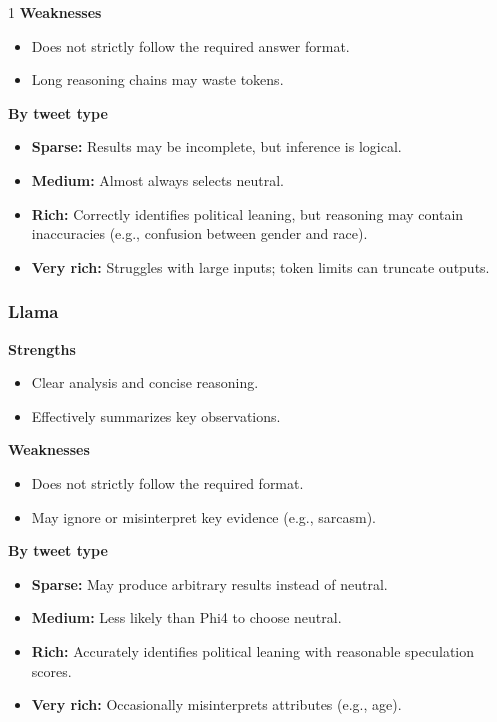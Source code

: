 \begin{spacing}{1}
\textbf{Weaknesses}
\begin{itemize}
    \item Does not strictly follow the required answer format.
    \item Long reasoning chains may waste tokens.
\end{itemize}

\textbf{By tweet type}
\begin{itemize}
    \item \textbf{Sparse:} Results may be incomplete, but inference is logical.
    \item \textbf{Medium:} Almost always selects neutral.
    \item \textbf{Rich:} Correctly identifies political leaning, but reasoning may contain inaccuracies (e.g., confusion between gender and race).
    \item \textbf{Very rich:} Struggles with large inputs; token limits can truncate outputs.
\end{itemize}

\subsubsection{Llama}
\textbf{Strengths}
\begin{itemize}
    \item Clear analysis and concise reasoning.
    \item Effectively summarizes key observations.
\end{itemize}

\textbf{Weaknesses}
\begin{itemize}
    \item Does not strictly follow the required format.
    \item May ignore or misinterpret key evidence (e.g., sarcasm).
\end{itemize}

\textbf{By tweet type}
\begin{itemize}
    \item \textbf{Sparse:} May produce arbitrary results instead of neutral.
    \item \textbf{Medium:} Less likely than Phi4 to choose neutral.
    \item \textbf{Rich:} Accurately identifies political leaning with reasonable speculation scores.
    \item \textbf{Very rich:} Occasionally misinterprets attributes (e.g., age).
\end{itemize}


\end{spacing}
